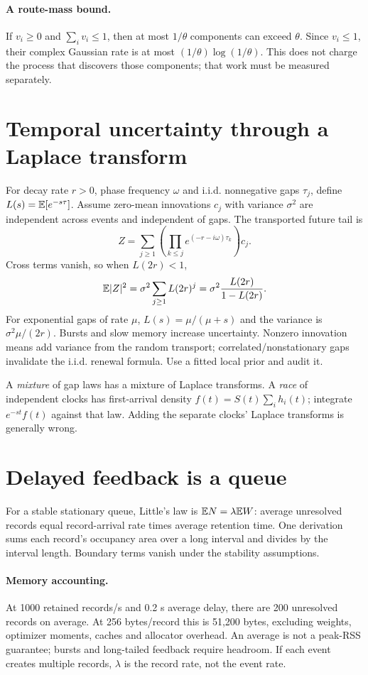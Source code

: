 \documentclass[11pt]{article}
\begin{document}
\paragraph{A route-mass bound.} If $v_i\ge0$ and $\sum_iv_i\le1$, then at most $1/\theta$ components can exceed $\theta$. Since $v_i\le1$, their complex Gaussian rate is at most $(1/\theta)\log(1/\theta)$. This does not charge the process that discovers those components; that work must be measured separately.
\section{Temporal uncertainty through a Laplace transform}
For decay rate $r>0$, phase frequency $\omega$ and i.i.d. nonnegative gaps $\tau_j$, define $L(s)=\mathbb{E}[e^{-s\tau}]$. Assume zero-mean innovations $c_j$ with variance $\sigma^2$ are independent across events and independent of gaps. The transported future tail is
\[
 Z=\sum_{j\ge1}\left(\prod_{k\le j}e^{(-r-i\omega)\tau_k}\right)c_j.
\]
Cross terms vanish, so when $L(2r)<1$,
\[
 \mathbb{E}|Z|^2=\sigma^2\sum_{j\ge1}L(2r)^j
 =\sigma^2\frac{L(2r)}{1-L(2r)}.
\]
For exponential gaps of rate $\mu$, $L(s)=\mu/(\mu+s)$ and the variance is $\sigma^2\mu/(2r)$. Bursts and slow memory increase uncertainty. Nonzero innovation means add variance from the random transport; correlated/nonstationary gaps invalidate the i.i.d. renewal formula. Use a fitted local prior and audit it.
\begin{keyidea}
A \emph{mixture} of gap laws has a mixture of Laplace transforms. A \emph{race} of independent clocks has first-arrival density $f(t)=S(t)\sum_ih_i(t)$; integrate $e^{-st}f(t)$ against that law. Adding the separate clocks' Laplace transforms is generally wrong.
\end{keyidea}
\section{Delayed feedback is a queue}
For a stable stationary queue, Little's law is $\mathbb{E} N=\lambda\mathbb{E} W$: average unresolved records equal record-arrival rate times average retention time. One derivation sums each record's occupancy area over a long interval and divides by the interval length. Boundary terms vanish under the stability assumptions.
\paragraph{Memory accounting.} At 1000 retained records/s and 0.2 s average delay, there are 200 unresolved records on average. At 256 bytes/record this is 51,200 bytes, excluding weights, optimizer moments, caches and allocator overhead. An average is not a peak-RSS guarantee; bursts and long-tailed feedback require headroom. If each event creates multiple records, $\lambda$ is the record rate, not the event rate.
\end{document}

